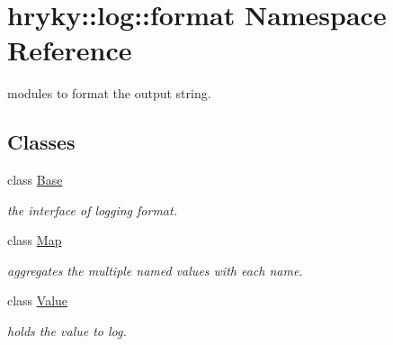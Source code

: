 \hypertarget{namespacehryky_1_1log_1_1format}{\section{hryky\-:\-:log\-:\-:format Namespace Reference}
\label{namespacehryky_1_1log_1_1format}
}


modules to format the output string.  


\subsection*{Classes}
\begin{DoxyCompactItemize}
\item 
class \hyperlink{classhryky_1_1log_1_1format_1_1_base}{Base}
\begin{DoxyCompactList}\small\item\em the interface of logging format. \end{DoxyCompactList}\item 
class \hyperlink{classhryky_1_1log_1_1format_1_1_map}{Map}
\begin{DoxyCompactList}\small\item\em aggregates the multiple named values with each name. \end{DoxyCompactList}\item 
class \hyperlink{classhryky_1_1log_1_1format_1_1_value}{Value}
\begin{DoxyCompactList}\small\item\em holds the value to log. \end{DoxyCompactList}\end{DoxyCompactItemize}

